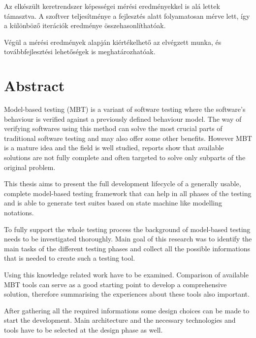 Az elkészült keretrendszer képességei mérési eredményekkel is alá lettek támasztva. A szoftver teljesítménye a fejlesztés alatt folyamatosan mérve lett, így a különböző iterációk eredménye összehasonlíthatóak.

Végül a mérési eredmények alapján kiértékelhető az elvégzett munka, és továbbfejlesztési lehetőségek is meghatározhatóak.

\vfill
{}
\englishParagraph


\chapter*{Abstract}
\label{cha:abstract}

Model-based testing (MBT) is a variant of software testing where the software's behaviour is verified against a previously defined behaviour model. The way of verifying softwares using this method can solve the most crucial parts of traditional software testing and may also offer some other benefits. However MBT is a mature idea and the field is well studied, reports show that available solutions are not fully complete and often targeted to solve only subparts of the original problem.

This thesis aims to present the full development lifecycle of a generally usable, complete model-based testing framework that can help in all phases of the testing and is able to generate test suites based on state machine like modelling notations.

To fully support the whole testing process the background of model-based testing needs to be investigated thoroughly. Main goal of this research was to identify the main tasks of the different testing phases and collect all the possible informations that is needed to create such a testing tool.

Using this knowledge related work have to be examined. Comparison of available MBT tools can serve as a good starting point to develop a comprehensive solution, therefore summarising the experiences about these tools also important.

After gathering all the required informations some design choices can be made to start the development. Main architecture and the necessary technologies and tools have to be selected at the design phase as well.

